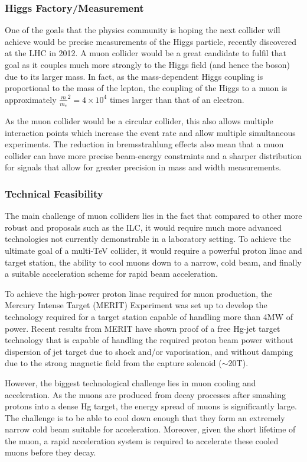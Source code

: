 \subsubsection{Higgs Factory/Measurement}
 
One of the goals that the physics community is hoping the next collider will achieve would be precise measurements of the Higgs particle, recently discovered at the LHC in 2012.  A muon collider would be a great candidate to fulfil that goal as it couples much more strongly to the Higgs field (and hence the boson) due to its larger mass. In fact, as the mass-dependent Higgs coupling is proportional to the mass of the lepton, the coupling of the Higgs to a muon is approximately $\frac{m}{m_e}^2 = 4 \times 10^4$ times larger than that of an electron.
 
As the muon collider would be a circular collider, this also allows multiple interaction points which increase the event rate and allow multiple simultaneous experiments. The reduction in bremsstrahlung effects also mean that a muon collider can have more precise beam-energy constraints and a sharper distribution for signals that allow for greater precision in mass and width measurements.

\subsubsection{Technical Feasibility}
 
The main challenge of muon colliders lies in the fact that compared to other more robust and proposals such as the ILC, it would require much more advanced technologies not currently demonstrable in a laboratory setting. To achieve the ultimate goal of a multi-TeV collider, it would require a powerful proton linac and target station, the ability to cool muons down to a narrow, cold beam, and finally a suitable acceleration scheme for rapid beam acceleration.
 
To achieve the high-power proton linac required for muon production, the Mercury Intense Target (MERIT) Experiment was set up to develop the technology required for a target station capable of handling  more than 4MW of power. Recent results from MERIT have shown proof of a free Hg-jet target technology that is capable of handling the required proton beam power without dispersion of jet target due to shock and/or vaporisation, and without damping due to the strong magnetic field from the capture solenoid ($\sim$20T).
 
However, the biggest technological challenge lies in muon cooling and acceleration. As the muons are produced from decay processes after smashing protons into a dense Hg target, the energy spread of muons is significantly large. The challenge is to be able to cool down enough that they form an extremely narrow cold beam suitable for acceleration. Moreover, given the short lifetime of the muon, a rapid acceleration system is required to accelerate these cooled muons before they decay.
 
